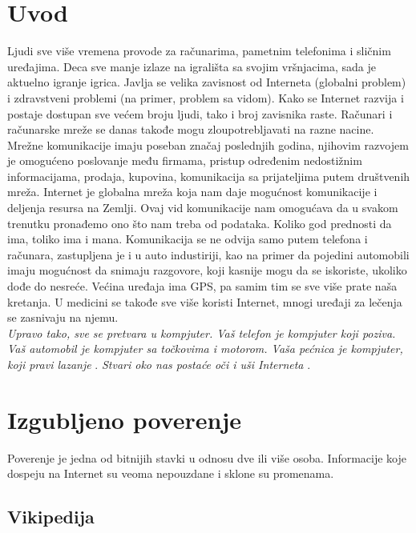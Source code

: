\documentclass[a4paper]{article}
\begin{document}
\section{Uvod}
\label{sec:uvod}
Ljudi sve više vremena provode za računarima, pametnim telefonima i sličnim uređajima. Deca sve manje izlaze na igrališta sa svojim vršnjacima, sada je aktuelno igranje igrica. Javlja se velika zavisnost od Interneta (globalni problem) i zdravstveni problemi (na primer, problem sa vidom). Kako se Internet razvija i postaje dostupan sve većem broju ljudi, tako i broj zavisnika raste. Računari i računarske mreže se danas takođe mogu zloupotrebljavati na razne nacine.
Mrežne komunikacije imaju poseban značaj poslednjih godina, njihovim razvojem je omogućeno poslovanje među firmama, pristup određenim nedostižnim informacijama, prodaja, kupovina, komunikacija sa prijateljima putem društvenih mreža. Internet je globalna mreža koja nam daje mogućnost komunikacije i deljenja resursa na Zemlji. Ovaj vid komunikacije nam omogućava da u svakom trenutku pronađemo ono što nam treba od podataka. Koliko god prednosti da ima, toliko ima i mana. Komunikacija se ne odvija samo putem telefona i računara, zastupljena je i u auto industiriji, kao na primer da pojedini automobili imaju mogućnost da snimaju razgovore, koji kasnije mogu da se iskoriste, ukoliko dođe do nesreće. Većina uređaja ima GPS, pa samim tim se sve više prate naša kretanja. U medicini se takođe sve više koristi Internet, mnogi uređaji za lečenja se zasnivaju na njemu. \\
		{\em Upravo tako, sve se pretvara u kompjuter. Vaš telefon je kompjuter koji poziva. Vaš automobil je kompjuter sa točkovima i motorom. Vaša pećnica je kompjuter, koji pravi lazanje} \cite{dataAndGoliath}.%
		{\em Stvari oko nas postaće oči i uši Interneta } \cite{dataAndGoliath}. %
        
\section{Izgubljeno poverenje}

Poverenje je jedna od  bitnijih stavki u odnosu dve ili više osoba. Informacije koje dospeju na Internet su veoma nepouzdane i sklone su promenama.

\subsection{Vikipedija}
\label{subsec:podnaslovIP1}
\end{document}
